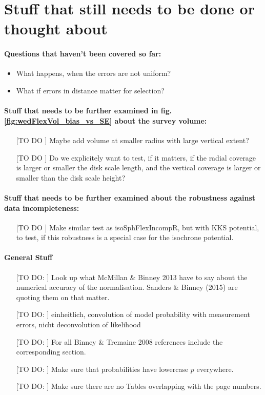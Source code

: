 \section{Stuff that still needs to be done or thought about}

\paragraph{Questions that haven't been covered so far:}
\begin{itemize}
\item What happens, when the errors are not uniform?
\item What if errors in distance matter for selection?
\end{itemize}

\paragraph{Stuff that needs to be further examined in fig. \ref{fig:wedFlexVol_bias_vs_SE} about the survey volume:}
\begin{itemize}
\item[[TO DO]] Maybe add volume at smaller radius with large vertical extent?
\item[[TO DO]] Do we explicitely want to test, if it matters, if the radial coverage is larger or smaller the disk scale length, and the vertical coverage is larger or smaller than the disk scale height?
\end{itemize}

\paragraph{Stuff that needs to be further examined about the robustness against data incompleteness:}
\begin{itemize}
\item[[TO DO]] Make similar test as isoSphFlexIncompR, but with KKS potential, to test, if this
robustness is a special case for the isochrone potential.
\end{itemize}

\paragraph{General Stuff}
\begin{itemize}
\item[[TO DO:]] Look up what McMillan \& Binney 2013 have to say about the numerical accuracy of the normalisation. Sanders \& Binney (2015) are quoting them on that matter.
\item[[TO DO:]] einheitlich, convolution of model probability with measurement errors, nicht deconvolution of likelihood
\item[[TO DO:]] For all Binney \& Tremaine 2008 references include the corresponding section.
\item[[TO DO:]] Make sure that probabilities have lowercase $p$ everywhere.
\item[[TO DO:]] Make sure there are no Tables overlapping with the page numbers.
\end{itemize}


